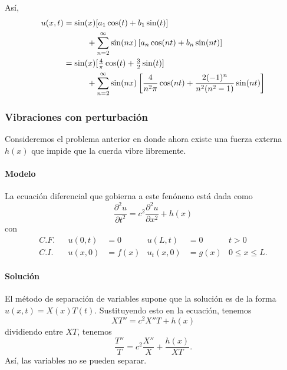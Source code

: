 \documentclass[11pt,letterpaper,draft]{report}
\theoremstyle{plain}
\theoremstyle{definition}
\theoremstyle{remark}
\newcommand\<{\langle}
\renewcommand\>{\rangle}
\begin{document}
Así,
\begin{align*}
  u(x,t)
  &= \sin(x)[a_1\cos(t)+b_1\sin(t)]
  \\ &\hspace{10mm}
  + \sum_{n=2}^{\infty}\sin(nx)
    \left[
      a_n\cos(nt)+b_n\sin(nt)
    \right] \\
  &= \sin(x)[\tfrac{4}{\pi}\cos(t)+\tfrac{3}{2}\sin(t)]
  \\ &\hspace{10mm}
  + \sum_{n=2}^{\infty}\sin(nx)
    \left[
      \frac{4}{n^2\pi}\cos(nt)+\frac{2(-1)^n}{n^2(n^2-1)}\sin(nt)
    \right] \\
\end{align*}

\subsubsection{Vibraciones con perturbación}
Consideremos el problema anterior en donde ahora existe una fuerza
externa $h(x)$ que impide que la cuerda vibre libremente.

\paragraph{Modelo}
La ecuación diferencial que gobierna a este fenóneno está dada como
\[
  \frac{\partial ^2u}{\partial t^2}
  = c^2 \frac{\partial ^2u}{\partial x^2} + h(x)
\]
con
\begin{align*}
  C.F.&& u(0,t)&=0 & u(L,t)&=0 & t>0 \\
  C.I.&& u(x,0)&=f(x) & u_t(x,0)&=g(x) & 0\leq x\leq L.
\end{align*}

\paragraph{Solución}
El método de separación de variables supone que la solución es de la
forma $u(x,t)=X(x)T(t)$. Sustituyendo esto en la ecuación, tenemos
\[
  XT''=c^2X''T+h(x)
\]
dividiendo entre $XT$, tenemos
\[
  \frac{T''}{T} = c^2 \frac{X''}{X} + \frac{h(x)}{XT}
.\]
Así, las variables no se pueden separar.
\end{document}

